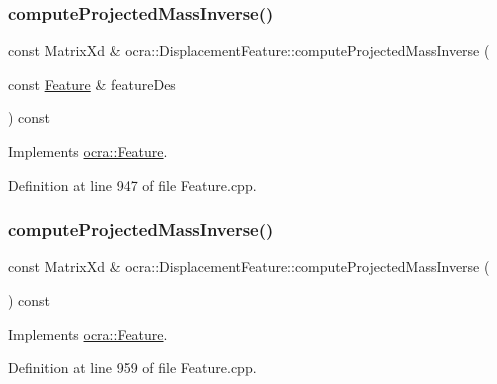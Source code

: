 \subsubsection{\texorpdfstring{compute\+Projected\+Mass\+Inverse()}{computeProjectedMassInverse()}\hspace{0.1cm}{\footnotesize\ttfamily [1/2]}}
{\footnotesize\ttfamily const Matrix\+Xd \& ocra\+::\+Displacement\+Feature\+::compute\+Projected\+Mass\+Inverse (\begin{DoxyParamCaption}\item[{const \hyperlink{classocra_1_1Feature}{Feature} \&}]{feature\+Des }\end{DoxyParamCaption}) const\hspace{0.3cm}{\ttfamily [virtual]}}



Implements \hyperlink{classocra_1_1Feature_ac529096b3fe8eba1ab88a56d8b042d37}{ocra\+::\+Feature}.



Definition at line 947 of file Feature.\+cpp.

\hypertarget{classocra_1_1DisplacementFeature_a3639d72ab7b85ac4b9533ed6498c0c03}{}\label{classocra_1_1DisplacementFeature_a3639d72ab7b85ac4b9533ed6498c0c03} 
\subsubsection{\texorpdfstring{compute\+Projected\+Mass\+Inverse()}{computeProjectedMassInverse()}\hspace{0.1cm}{\footnotesize\ttfamily [2/2]}}
{\footnotesize\ttfamily const Matrix\+Xd \& ocra\+::\+Displacement\+Feature\+::compute\+Projected\+Mass\+Inverse (\begin{DoxyParamCaption}{ }\end{DoxyParamCaption}) const\hspace{0.3cm}{\ttfamily [virtual]}}



Implements \hyperlink{classocra_1_1Feature_ac27bcbdbb8541e3b4e2c77a6d6f2ffc0}{ocra\+::\+Feature}.



Definition at line 959 of file Feature.\+cpp.

